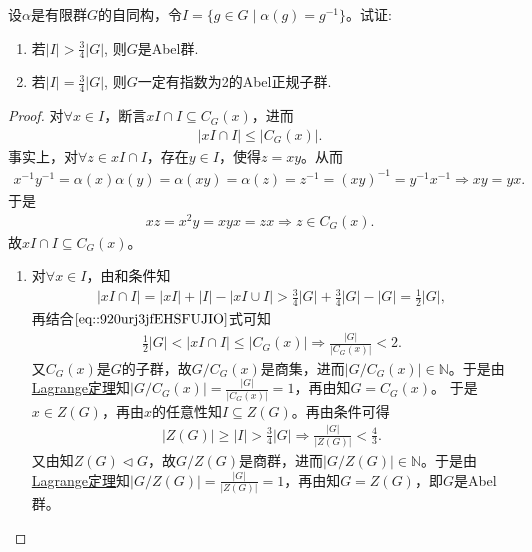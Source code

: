 \documentclass[../../main.tex]{subfiles}%
\begin{document}
\begin{example}
设$\alpha$是有限群$G$的自同构，令$I = \{g \in G \mid \alpha(g) = g^{-1}\}$。试证:
\begin{enumerate}[(1)]
\item 若$|I| > \frac{3}{4}|G|$, 则$G$是Abel群.
\item 若$|I| = \frac{3}{4}|G|$, 则$G$一定有指数为2的Abel正规子群.
\end{enumerate}
\end{example}
\begin{proof}

对$\forall x\in I$，断言$xI\cap I\subseteq C_G(x)$，进而
\begin{align}
|xI\cap I|\leqslant |C_G(x)|.
\label{eq::920urj3jfEHSFUJIO}
\end{align}
事实上，对$\forall z\in xI\cap I$，存在$y\in I$，使得$z=xy$。从而
\begin{align*}
x^{-1}y^{-1}=\alpha(x)\alpha(y)=\alpha(xy)=\alpha(z)=z^{-1}=(xy)^{-1}=y^{-1}x^{-1}\Longrightarrow xy=yx.
\end{align*}
于是
\begin{align*}
xz=x^2y=xyx=zx\Longrightarrow z\in C_G(x).
\end{align*}
故$xI\cap I\subseteq C_G(x)$。
\begin{enumerate}[(1)]
\item 对$\forall x\in I$，由和条件知
\begin{align*}
|xI\cap I|=|xI|+|I|-|xI\cup I|>\frac{3}{4}|G|+\frac{3}{4}|G|-|G|=\frac{1}{2}|G|,
\end{align*}
再结合$\eqref{eq::920urj3jfEHSFUJIO}$式可知
\begin{align*}
\frac{1}{2}|G|<|xI\cap I|\leqslant |C_G(x)|\Longrightarrow \frac{|G|}{|C_G(x)|}<2.
\end{align*}
又$C_G(x)$是$G$的子群，故$G/C_G(x)$是商集，进而$|G/C_G(x)|\in \mathbb{N}$。于是由\hyperref[theorem:抽象代数--Lagrange定理]{Lagrange定理}知$|G/C_G(x)|=\frac{|G|}{|C_G(x)|}=1$，再由知$G=C_G(x)$。
于是$x\in Z(G)$，再由$x$的任意性知$I\subseteq Z(G)$。再由条件可得
\begin{align*}
|Z(G)|\geqslant |I|>\frac{3}{4}|G|\Longrightarrow \frac{|G|}{|Z(G)|}<\frac{4}{3}.
\end{align*}
又由知$Z(G)\lhd G$，故$G/Z(G)$是商群，进而$|G/Z(G)|\in \mathbb{N}$。于是由\hyperref[theorem:抽象代数--Lagrange定理]{Lagrange定理}知$|G/Z(G)|=\frac{|G|}{|Z(G)|}=1$，再由知$G=Z(G)$，即$G$是Abel群。

\end{enumerate}
\end{proof}
\end{document}
